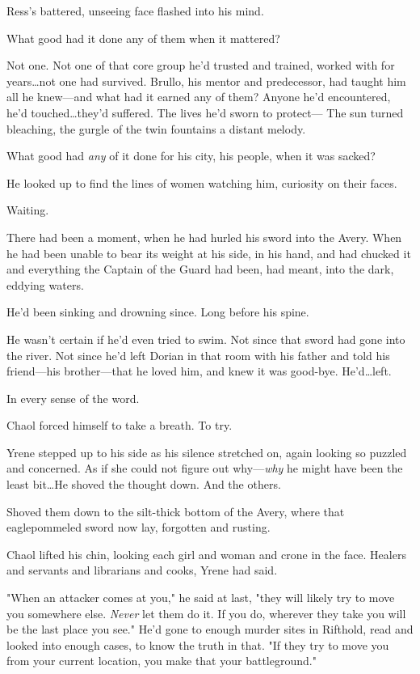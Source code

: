 Ress's battered, unseeing face flashed into his mind.

What good had it done any of them when it mattered?

Not one.
Not one of that core group he'd trusted and trained, worked with for years\ldots not one had survived.
Brullo, his mentor and predecessor, had taught him all he knew---and what had it earned any of them?
Anyone he'd encountered, he'd touched\ldots they'd suffered.
The lives he'd sworn to protect--- The sun turned bleaching, the gurgle of the twin fountains a distant melody.

What good had \emph{any} of it done for his city, his people, when it was sacked?

He looked up to find the lines of women watching him, curiosity on their faces.

Waiting.

There had been a moment, when he had hurled his sword into the Avery.
When he had been unable to bear its weight at his side, in his hand, and had chucked it and everything the Captain of the Guard had been, had meant, into the dark, eddying waters.

He'd been sinking and drowning since.
Long before his spine.

He wasn't certain if he'd even tried to swim.
Not since that sword had gone into the river.
Not since he'd left Dorian in that room with his father and told his friend---his brother---that he loved him, and knew it was good-bye.
He'd\ldots left.

In every sense of the word.

Chaol forced himself to take a breath.
To try.

Yrene stepped up to his side as his silence stretched on, again looking so puzzled and concerned.
As if she could not figure out why---\emph{why} he might have been the least bit\ldots He shoved the thought down.
And the others.

Shoved them down to the silt-thick bottom of the Avery, where that eaglepommeled sword now lay, forgotten and rusting.

Chaol lifted his chin, looking each girl and woman and crone in the face.
Healers and servants and librarians and cooks, Yrene had said.

"When an attacker comes at you," he said at last, "they will likely try to move you somewhere else.
\emph{Never} let them do it.
If you do, wherever they take you will be the last place you see."
He'd gone to enough murder sites in Rifthold, read and looked into enough cases, to know the truth in that.
"If they try to move you from your current location, you make that your battleground."

